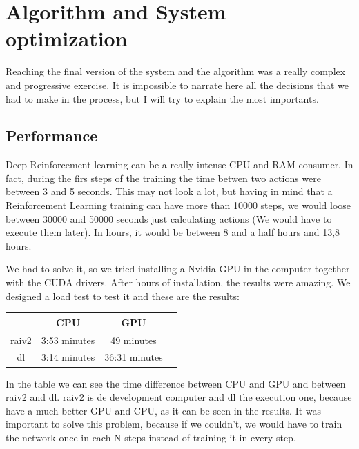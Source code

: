 	\section{Algorithm and System optimization}
	
		Reaching the final version of the system and the algorithm was a really complex and progressive exercise. It is impossible to narrate here all the decisions that we had to make in the process, but I will try to explain the most importants.
		
		\subsection{Performance}
			
			Deep Reinforcement learning can be a really intense CPU and RAM consumer. In fact, during the firs steps of the training the time betwen two actions were between 3 and 5 seconds. This may not look a lot, but having in mind that a Reinforcement Learning training can have more than 10000 steps, we would loose between 30000 and 50000 seconds just calculating actions (We would have to execute them later). In hours, it would be between 8 and a half hours and 13,8 hours.
			
			We had to solve it, so we tried installing a Nvidia GPU in the computer together with the CUDA drivers. After hours of installation, the results were amazing. We designed a load test to test it and these are the results:
			
			\begin{center}
				\begin{tabular}{cccc}
					\toprule 
					& CPU  & GPU \\ 
					\midrule
					\rowcolor{black!20} raiv2 & 3:53 minutes & 49 minutes \\
					dl & 3:14 minutes & 36:31 minutes \\ 
					\bottomrule
				\end{tabular}
			\end{center}
			
			In the table we can see the time difference between CPU and GPU and between raiv2 and dl. raiv2 is de development computer and dl the execution one, because have a much better GPU and CPU, as it can be seen in the results. It was important to solve this problem, because if we couldn't, we would have to train the network once in each N steps instead of training it in every step.
			
